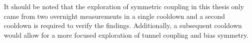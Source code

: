 It should be noted that the exploration of symmetric coupling in this thesis only came from two overnight measurements in a single cooldown and a second cooldown is required to verify the findings. Additionally, a subsequent cooldown would allow for a more focused exploration of tunnel coupling and bias symmetry. 
 








